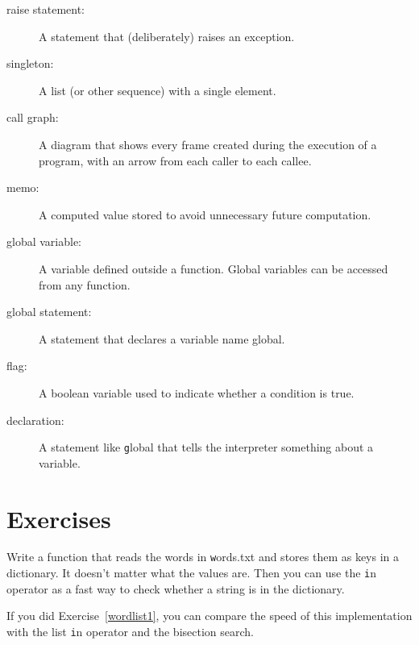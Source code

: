 \documentclass[
DIV=11,
fontsize=12,
twoside,
headinclude=false,
titlepage=firstiscover,
abstract=true,
headsepline=true,
footsepline=true,
chapterprefix=true, %
headings=big,
bibliography=totoc,%
captions=tableheading
]{scrbook}
\theoremstyle{definition}
\begin{document}
\begin{description}
\item[raise statement:]  A statement that (deliberately) raises an exception.

\item[singleton:] A list (or other sequence) with a single element.

\item[call graph:] A diagram that shows every frame created during
the execution of a program, with an arrow from each caller to
each callee. 

\item[memo:] A computed value stored to avoid unnecessary future 
computation.

\item[global variable:]  A variable defined outside a function.  Global
variables can be accessed from any function.

\item[global statement:]  A statement that declares a variable name
global.

\item[flag:] A boolean variable used to indicate whether a condition
is true.

\item[declaration:] A statement like {\texttt global} that tells the
interpreter something about a variable.

\end{description}


\section{Exercises}

\begin{exercise}
\normalfont
\label{wordlist2}

Write a function that reads the words in {\texttt words.txt} and
stores them as keys in a dictionary.  It doesn't matter what the
values are.  Then you can use the {\texttt in} operator
as a fast way to check whether a string is in
the dictionary.

If you did Exercise~\ref{wordlist1}, you can compare the speed
of this implementation with the list {\texttt in} operator and the
bisection search.

\end{exercise}
\end{document}

